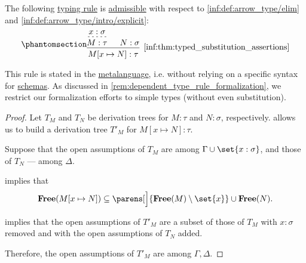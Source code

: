 \begin{proposition}\label{thm:typed_substitution_assertions}
  The following \hyperref[con:typing_rule]{typing rule} is \hyperref[con:inference_rule_admissibility]{admissible} with respect to \ref{inf:def:arrow_type/elim} and \ref{inf:def:arrow_type/intro/explicit}:
  \begin{equation*}\taglabel[\ensuremath{ Subst }]{inf:thm:typed_substitution_assertions}
    \begin{prooftree}
      \hypo{ x: \sigma }
      \infer[dashed]1{ M: \tau }

      \hypo{ N: \sigma }
      \infer2[\ref{inf:thm:typed_substitution_assertions}]{ M[x \mapsto N]: \tau }.
    \end{prooftree}
  \end{equation*}
\end{proposition}
\begin{comments}
  \item This rule is stated in the \hyperref[con:metalogic]{metalanguage}, i.e. without relying on a specific syntax for \hyperref[con:schemas_and_instances]{schemas}. As discussed in \cref{rem:dependent_type_rule_formalization}, we restrict our formalization efforts to simple types (without even substitution).
\end{comments}
\begin{proof}
  Let \( T_M \) and \( T_N \) be derivation trees for \( M: \tau \) and \( N: \sigma \), respectively.  allows us to build a derivation tree \( T'_M \) for \( M[x \mapsto N]: \tau \).

  Suppose that the open assumptions of \( T_M \) are among \( \Gamma \cup \set{ x: \sigma } \), and those of \( T_N \) --- among \( \Delta \).

   implies that
  \begin{equation*}
    \op*{Free}(M[x \mapsto N]) \subseteq \parens[\Big]{ \op*{Free}(M) \setminus \set{ x } } \cup \op*{Free}(N).
  \end{equation*}

   implies that the open assumptions of \( T'_M \) are a subset of those of \( T_M \) with \( x: \sigma \) removed and with the open assumptions of \( T_N \) added.

  Therefore, the open assumptions of \( T'_M \) are among \( \Gamma, \Delta \).
\end{proof}

